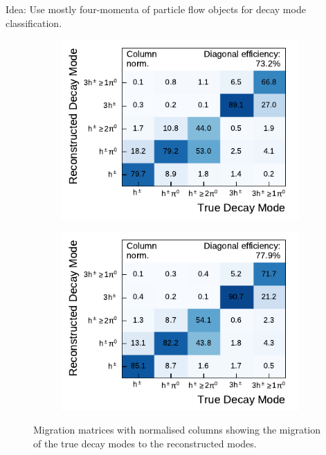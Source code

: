 Idea: Use mostly four-momenta of particle flow objects for decay mode
classification.

\begin{figure}[ht]
  \begin{subfigure}[t]{0.48\textwidth}
    \centering
    \includegraphics{./figures/decay_mode_classification/mig_mat_pantau.pdf}
  \end{subfigure}\hfill
  \begin{subfigure}[t]{0.48\textwidth}
    \centering
    \includegraphics{./figures/decay_mode_classification/mig_mat_baseline_ptcut_1_5.pdf}
  \end{subfigure}
  \caption{Migration matrices with normalised columns showing the migration of
    the true decay modes to the reconstructed modes.}
  \label{fig:migmat}
\end{figure}


